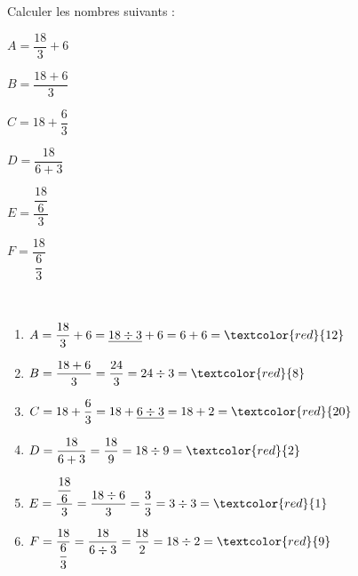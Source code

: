 \begin{exercice} %
   Calculer les nombres suivants :
   \setlength{\columnseprule}{0pt}
   \begin{multicols}{2}
      \begin{list}{}{}
         \item $A=\dfrac{18}{3}+6$
         \item $B=\dfrac{18+6}{3}$         
         \item $C=18+\dfrac{6}{3}$
         \columnbreak         
         \item $D=\dfrac{18}{6+3}$\medskip         
         \item $E=\dfrac{\dfrac{18}{6}}{3}$\medskip
         \item $F=\dfrac{18}{\dfrac{6}{3}}$         
      \end{list}
   \end{multicols}
 \end{exercice}
 
 \begin{corrige}
    \ \\ [-5mm]
    \begin{enumerate}
       \item $A=\dfrac{18}{3}+6 =\underline{18\div3}+6 =6+6 =\textcolor{red}{12}$ \medskip
       \item $B=\dfrac{18+6}{3} =\dfrac{24}{3} =24\div3 =\textcolor{red}{8}$ \medskip
       \item $C=18+\dfrac{6}{3} =18+\underline{6\div3} =18+2 =\textcolor{red}{20}$ \medskip
       \item $D=\dfrac{18}{6+3} =\dfrac{18}{9} =18\div9 =\textcolor{red}{2}$ \medskip
       \item $E=\dfrac{\dfrac{18}{6}}{3} =\dfrac{18\div6}{3} =\dfrac{3}{3} =3\div3 =\textcolor{red}{1}$ \medskip
       \item $F=\dfrac{18}{\dfrac{6}{3}} =\dfrac{18}{6\div3} =\dfrac{18}{2} =18\div2 =\textcolor{red}{9}$
    \end{enumerate}
 \end{corrige}